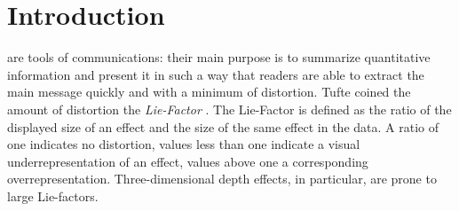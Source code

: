 \section{Introduction}
%
%



% 
% 
% 
% 
 are tools of communications: their main purpose is  to summarize quantitative information and present it in such a way that readers are able to extract the main message quickly and with a minimum of distortion. Tufte  coined the amount of distortion the \emph{Lie-Factor} \citep[p. 57--69]{tufte}. The Lie-Factor is defined as the ratio of the displayed size of an effect and the size of the same effect in the data. A ratio of one indicates no distortion, values less than one indicate a visual underrepresentation of an effect, values above one a corresponding overrepresentation. Three-dimensional depth effects, in particular, are prone to large Lie-factors.

